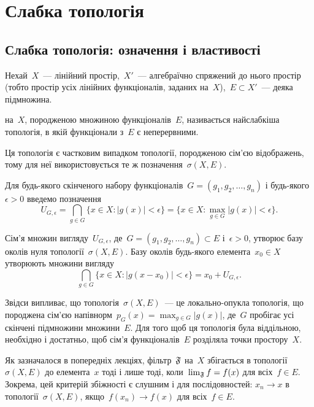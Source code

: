 \chapter{Слабка топологія}

\section{Слабка топологія: означення і властивості}

\begin{definition}
    Нехай~$X$~--- лінійний простір,~$X'$~--- алгебраїчно спряжений до нього простір (тобто простір усіх лінійних функціоналів, заданих на~$X$),~$E \subset X'$~--- деяка підмножина. 
    
     на~$X$, породженою множиною функціоналів~$E$, називається найслабкіша топологія, в якій функціонали з~$E$ є неперервними.
\end{definition}

\begin{remark}
    Ця топологія є частковим випадком топології, породженою сім'єю відображень, тому для неї використовується те ж позначення~$\sigma(X, E)$.
\end{remark}

Для будь-якого скінченого набору функціоналів~$G = (g_1, g_2, \dots, g_n)$ і будь-якого~$\epsilon > 0$ введемо позначення
\begin{equation*}
    U_{G, \epsilon} = \bigcap_{g \in G} \{x \in X: |g(x)| < \epsilon\} = \{x \in X: \max_{g \in G} |g(x)| < \epsilon\}.
\end{equation*}

Сім'я множин вигляду~$U_{G,\epsilon}$, де~$G = (g_1, g_2, \dots, g_n) \subset E$ і~$\epsilon > 0$, утворює базу околів нуля топології~$\sigma(X, E)$. Базу околів будь-якого елемента~$x_0 \in X$ утворюють множини вигляду 
\begin{equation*}
    \bigcap_{g \in G} \{x \in X: |g(x - x_0)| < \epsilon\} = x_0 + U_{G, \epsilon}.
\end{equation*}

Звідси випливає, що топологія~$\sigma(X, E)$~--- це локально-опукла топологія, що породжена сім'єю напівнорм~$p_G(x) = \max_{g \in G} |g(x)|$, де~$G$ пробігає усі скінчені підмножини множини~$E$. Для того щоб ця топологія була віддільною, необхідно і достатньо, щоб сім'я функціоналів~$E$ розділяла точки простору~$X$.

Як зазначалося в попередніх лекціях, фільтр~$\frak F$ на~$X$ збігається в топології~$\sigma(X, E)$ до елемента~$x$ тоді і лише тоді, коли~$\lim_{\frak F} f = f(x)$ для всіх~$f \in E$. Зокрема, цей критерій збіжності є слушним і для послідовностей: $x_n \to x$ в топології~$\sigma(X, E)$, якщо~$f(x_n) \to f(x)$ для всіх~$f \in E$.

